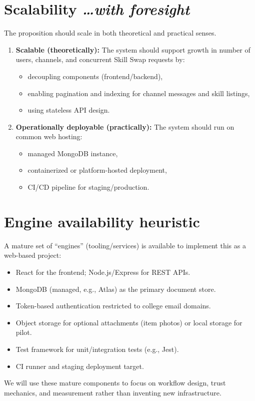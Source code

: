 \documentclass[11pt,a4paper]{article}
\newcommand{\BvrHint}[1]{%
  {\normalfont\normalsize\itshape\hfill #1}}
\begin{document}
\section{Scalability %
\BvrHint{\ldots with foresight}}
The proposition should scale in both theoretical and practical senses.

\begin{enumerate}[leftmargin=0.7cm]
    \item \textbf{Scalable (theoretically):} The system should support growth in number of users, channels, and concurrent Skill Swap requests by:
    \begin{itemize}[leftmargin=0.7cm]
        \item decoupling components (frontend/backend),
        \item enabling pagination and indexing for channel messages and skill listings,
        \item using stateless API design.
    \end{itemize}
    
    \item \textbf{Operationally deployable (practically):} The system should run on common web hosting:
    \begin{itemize}[leftmargin=0.7cm]
        \item managed MongoDB instance,
        \item containerized or platform-hosted deployment,
        \item CI/CD pipeline for staging/production.
    \end{itemize}
\end{enumerate}

\section{Engine availability heuristic}
A mature set of ``engines'' (tooling/services) is available to implement this as a web-based project:
\begin{itemize}[leftmargin=0.7cm]
    \item React for the frontend; Node.js/Express for REST APIs.
    \item MongoDB (managed, e.g., Atlas) as the primary document store.
    \item Token-based authentication restricted to college email domains.
    \item Object storage for optional attachments (item photos) or local storage for pilot.
    \item Test framework for unit/integration tests (e.g., Jest).
    \item CI runner and staging deployment target.
\end{itemize}
We will use these mature components to focus on workflow design, trust mechanics, and measurement rather than inventing new infrastructure.
\end{document}
